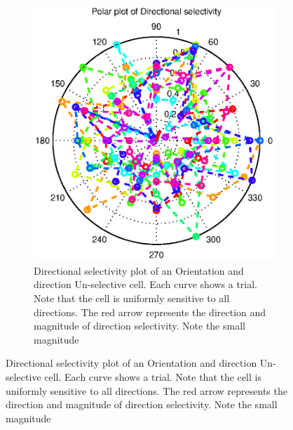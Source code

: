 \documentclass[11pt]{article}
\begin{document}
\begin{enumerate}
\begin{figure}
\begin{subfigure}{.48\textwidth}
            \centering
            \includegraphics[width=\linewidth]{plots/min_cirvar_dir}
            \caption{Directional selectivity plot of an Orientation and direction Un-selective cell. Each curve shows a trial. Note that the cell is uniformly sensitive to all directions. The red arrow represents the direction and magnitude of direction selectivity. Note the small magnitude}
        \end{subfigure}
    \end{figure}
\end{enumerate}

\newpage

% 

\end{document}
